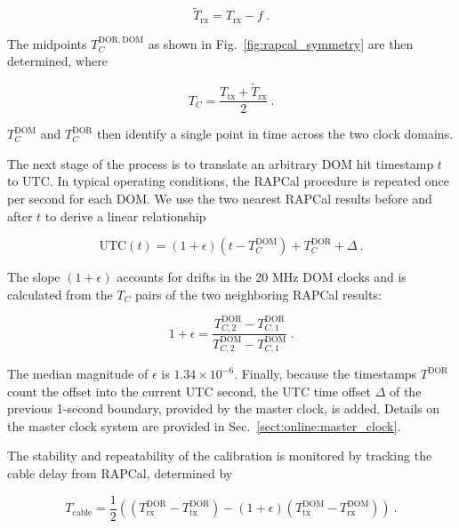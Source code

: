 \begin{equation}
  \tilde{T}_{\mathrm{rx}} = T_{\mathrm{rx}} - f\ .
\end{equation}


\noindent The midpoints $T_C^{\mathrm{DOR,DOM}}$ as shown in
Fig.~\ref{fig:rapcal_symmetry} are then determined, where

\begin{equation}
  T_C =  \frac{T_{\mathrm{tx}} + \tilde{T}_{\mathrm{rx}}}{2}\ .
\end{equation}

\noindent $T_C^{\mathrm{DOM}}$ and $T_C^{\mathrm{DOR}}$ then identify a
single point in time across the two clock domains.

The next stage of the process is to translate an arbitrary DOM hit timestamp
$t$ to UTC.  In typical operating conditions, the RAPCal procedure
is repeated once per second for each DOM.  We use the two nearest RAPCal
results before and after $t$ to derive a linear relationship

\begin{equation}
  \mathrm{UTC}(t) = (1+\epsilon)(t - T_C^{\mathrm{DOM}}) +
  T_C^{\mathrm{DOR}} + \Delta\ .
\end{equation}

\noindent The slope $(1+\epsilon)$ accounts for drifts in the 20 MHz DOM
clocks and is calculated from the $T_C$ pairs of the two neighboring RAPCal
results: 

\begin{equation}
  1+\epsilon = \frac{T_{C,2}^{\mathrm{DOR}} -
    T_{C,1}^{\mathrm{DOR}}}{T_{C,2}^{\mathrm{DOM}} -
    T_{C,1}^{\mathrm{DOM}}}\ .
\end{equation}

\noindent The median magnitude of $\epsilon$ is $1.34 \times 10^{-6}$.
Finally, because the timestamps $T^{\mathrm{DOR}}$ count the offset into 
the current UTC second, the UTC time offset $\Delta$ of the previous
1-second boundary, provided by the master clock, is added.  Details on the
master clock system are provided in Sec.~\ref{sect:online:master_clock}.

The stability and repeatability of the calibration is monitored by
tracking the cable delay from RAPCal, determined by

\begin{equation}
  T_{\mathrm{cable}} = \frac{1}{2} \left( ( T_{\mathrm{rx}}^{\mathrm{DOR}} -
  T_{\mathrm{tx}}^{\mathrm{DOR}} ) - (1+\epsilon)(T_{\mathrm{tx}}^{\mathrm{DOM}} -
  T_{\mathrm{rx}}^{\mathrm{DOM}} )\right) \ .
\end{equation}

